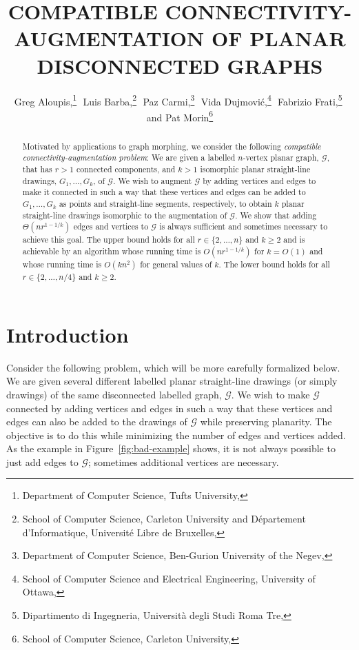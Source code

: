 \documentclass[11pt]{patmorin}
\title{\MakeUppercase{Compatible Connectivity-Augmentation \newline of Planar Disconnected Graphs}}
\author{Greg Aloupis,\thanks{Department of Computer Science, Tufts University, 
                             \email{aloupis.greg@gmail.com}}\,\,
       Luis Barba,\thanks{School of Computer Science, Carleton University
                          and Département d'Informatique, 
                          Université Libre de Bruxelles,
                          \email{lbarbafl@ulb.ac.be}}\,\,
       Paz Carmi,\thanks{Department of Computer Science,
                         Ben-Gurion University of the Negev,
                         \email{carmip@cs.bgu.ac.il}}\,\,
       Vida Dujmović,\thanks{School of Computer Science 
                             and Electrical Engineering,
                             University of Ottawa,
                             \email{vida.dujmovic@uottawa.ca}}\,\,
       Fabrizio Frati,\thanks{Dipartimento di Ingegneria,
                              Università degli Studi Roma Tre,
                              \email{frati@dia.uniroma3.it}}\,\,
       and Pat Morin\thanks{School of Computer Science, Carleton University,
                            \email{morin@scs.carleton.ca}}}
\begin{document}
\begin{titlepage}

\maketitle
\begin{abstract}
Motivated by applications to graph morphing, we consider the following
\emph{compatible connectivity-augmentation problem}: We are given
a labelled $n$-vertex planar graph, $\mathcal{G}$, that has $r>1$
connected components, and $k>1$ isomorphic planar straight-line drawings,
$G_1,\ldots,G_k$, of $\mathcal{G}$. We wish to augment $\mathcal G$
by adding  vertices and edges to make it connected in such a way that
these vertices and edges can be added to $G_1,\ldots,G_k$ as points and
straight-line segments, respectively, to obtain $k$ planar straight-line
drawings isomorphic to the augmentation of $\mathcal G$.  We show
that adding $\Theta(nr^{1-1/k})$ edges and vertices to $\mathcal{G}$
is always sufficient and sometimes necessary to achieve this goal.
The upper bound holds for all $r\in\{2,\ldots,n\}$ and $k\ge 2$ and is
achievable by an algorithm whose running time is $O(nr^{1-1/k})$ for
$k=O(1)$ and whose running time is $O(kn^2)$ for general values of $k$.
The lower bound holds for all $r\in\{2,\ldots,n/4\}$ and $k\ge 2$.
\end{abstract}

\end{titlepage}


\section{Introduction}


Consider the following problem, which will be more carefully formalized
below.  We are given several different labelled planar straight-line drawings
(or simply drawings) of the same disconnected labelled graph, $\mathcal G$.
We wish to make $\mathcal G$ connected by adding vertices and edges in
such a way that these vertices and edges can also be added to the 
drawings of $\mathcal G$ while preserving planarity.  
The objective is to do this while minimizing the number
of edges and vertices added.  As the example in Figure~\ref{fig:bad-example} shows, it is not always possible to just add edges to $\mathcal G$; sometimes additional vertices are necessary.
\end{document}
